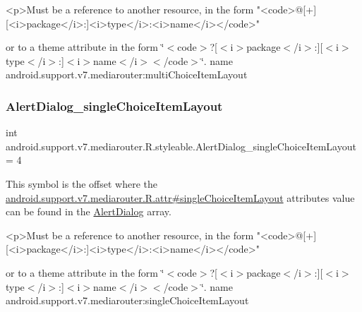 \begin{DoxyVerb}      <p>Must be a reference to another resource, in the form "<code>@[+][<i>package</i>:]<i>type</i>:<i>name</i></code>"
\end{DoxyVerb}
 or to a theme attribute in the form \char`\"{}$<$code$>$?\mbox{[}$<$i$>$package$<$/i$>$\+:\mbox{]}\mbox{[}$<$i$>$type$<$/i$>$\+:\mbox{]}$<$i$>$name$<$/i$>$$<$/code$>$\char`\"{}.  name android.\+support.\+v7.\+mediarouter\+:multi\+Choice\+Item\+Layout \mbox{\label{classandroid_1_1support_1_1v7_1_1mediarouter_1_1R_1_1styleable_adc94f1a936a7816d5ee670490f3f49df}} 
\subsubsection{\texorpdfstring{Alert\+Dialog\+\_\+single\+Choice\+Item\+Layout}{AlertDialog\_singleChoiceItemLayout}}
{\footnotesize\ttfamily int android.\+support.\+v7.\+mediarouter.\+R.\+styleable.\+Alert\+Dialog\+\_\+single\+Choice\+Item\+Layout = 4\hspace{0.3cm}{\ttfamily [static]}}

This symbol is the offset where the \hyperlink{classandroid_1_1support_1_1v7_1_1mediarouter_1_1R_1_1attr_aec1486090b6c1e8a66f14d79efdb2b40}{android.\+support.\+v7.\+mediarouter.\+R.\+attr\#single\+Choice\+Item\+Layout} attribute\textquotesingle{}s value can be found in the \hyperlink{classandroid_1_1support_1_1v7_1_1mediarouter_1_1R_1_1styleable_a2c8307beccb0eb2a93adf87cab8ef939}{Alert\+Dialog} array.

\begin{DoxyVerb}      <p>Must be a reference to another resource, in the form "<code>@[+][<i>package</i>:]<i>type</i>:<i>name</i></code>"
\end{DoxyVerb}
 or to a theme attribute in the form \char`\"{}$<$code$>$?\mbox{[}$<$i$>$package$<$/i$>$\+:\mbox{]}\mbox{[}$<$i$>$type$<$/i$>$\+:\mbox{]}$<$i$>$name$<$/i$>$$<$/code$>$\char`\"{}.  name android.\+support.\+v7.\+mediarouter\+:single\+Choice\+Item\+Layout \mbox{\label{classandroid_1_1support_1_1v7_1_1mediarouter_1_1R_1_1styleable_abcffe94741186dacd49a336e4ab2becb}} 

